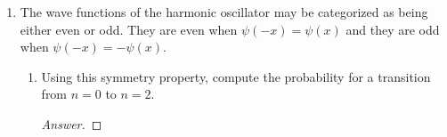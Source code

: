 \documentclass[../psets.tex]{subfiles}
\begin{document}
\begin{enumerate}
\begin{enumerate}
\begin{proof}
\begin{figure}[h!]
\begin{subfigure}[b]{0.3\linewidth}
                \end{subfigure}
                \begin{subfigure}[b]{0.3\linewidth}
                    \centering
                    \caption{Bend.}
                \end{subfigure}
            \end{figure}
        \end{proof}
    \end{enumerate}
    \item The wave functions of the harmonic oscillator may be categorized as being either even or odd. They are even when $\psi(-x)=\psi(x)$ and they are odd when $\psi(-x)=-\psi(x)$.
    \begin{enumerate}
        \item Using this symmetry property, compute the probability for a transition from $n=0$ to $n=2$.
        \begin{proof}[Answer]



\end{proof}
\end{enumerate}
\end{enumerate}
\end{document}
